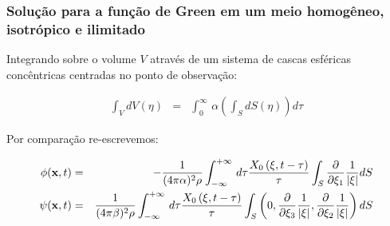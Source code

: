 \documentclass[xcolor=table]{beamer}
\newcommand{\xvec}{\mathbf{x}}
\newcommand{\xivec}{\boldmath \xi}
\begin{document}
\begin{frame}
\frametitle{\textbf{Solu\c{c}\~ao para a fun\c{c}\~ao de Green em um meio homog\^eneo, isotr\'opico e ilimitado}}

   \begin{flushleft}
     \textcolor{red!60!black}{
     Integrando sobre o volume $V$ atrav\'es de um sistema de cascas esf\'ericas conc\^entricas centradas no ponto de observa\c{c}\~ao:}
   \end{flushleft}        
\begin{eqnarray}
 \int_{V}dV(\eta) &=& \int_{0}^{\infty} \, \alpha \left( \int_{S} dS(\eta) \right) d\tau\, 
\end{eqnarray}

\begin{flushleft}
Por compara\c{c}\~ao re-escrevemos:
\end{flushleft}
\begin{eqnarray}
  \label{ten1}
       \phi(\xvec,t) &=& - \frac{1}{(4\pi\alpha)^{2} \rho}  \int_{-\infty}^{+\infty}\, d\tau \frac{ X_{0} \left( \xivec,t - \tau  \right) }{\tau}  \int_{S}\frac{\partial }{\partial \xi_1} \frac{1}{\left| \xivec \right|} dS\, \\
       \psi(\xvec,t) &=& \frac{1}{(4\pi\beta)^{2} \rho}  \int_{-\infty}^{+\infty}\, d\tau  \frac{ X_{0}  \left( \xivec,t - \tau  \right) }{\tau}    \int_{S} \left(0, \frac{\partial }{\partial \xi_3} \frac{1}{\left| \xivec \right|}, \frac{\partial }{\partial \xi_2} \frac{1}{\left| \xivec \right|} \right) dS \, \nonumber \\
\end{eqnarray}

\end{frame}%
\end{document}
